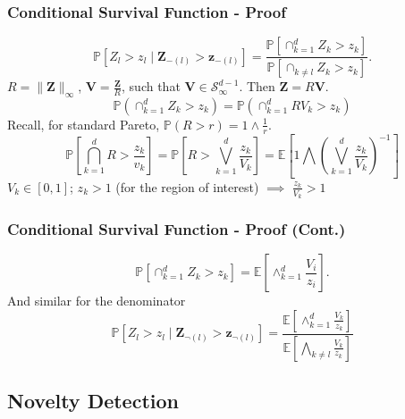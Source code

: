 \documentclass[aspectratio=169,10pt]{beamer}
\begin{document}
\begin{frame}
  \frametitle{Conditional Survival Function - Proof}
  {\small
  \begin{equation*}
    \label{eqn:condsurv1d}
    \mathbb{P}\left[Z_l > z_l\mid \bm{Z}_{-(l)} > \bm{z}_{-(l)}\right] =
      \frac{\mathbb{P}\left[\cap_{k = 1}^d Z_k > z_k\right]}{\mathbb{P}\left[\cap_{k \neq l} Z_k > z_k\right]}.
  \end{equation*}
  $R = \lVert\bm{Z}\rVert_{\infty}$, $\bm{V} = \frac{\bm{Z}}{R}$, such that
    $\bm{V}\in \mathcal{S}_{\infty}^{d-1}$.  Then $\bm{Z} = R\bm{V}$.
  \begin{equation*}
    \mathbb{P}\left(\cap_{k = 1}^d Z_k > z_k\right) = \mathbb{P}\left(\cap_{k = 1}^d RV_k > z_k\right)
  \end{equation*}
  Recall, for standard Pareto, $\mathbb{P}(R > r) = 1\wedge\frac{1}{r}$.
  \begin{equation*}
    \mathbb{P}\left[\bigcap_{k = 1}^d R > \frac{z_k}{v_k}\right] =
      \mathbb{P}\left[R  > \bigvee_{k=1}^d\frac{z_k}{V_k}\right] =
      \mathbb{E}\left[1 \bigwedge \left(\bigvee_{k = 1}^d\frac{z_k}{V_k}\right)^{-1}\right]
  \end{equation*}
  $V_k \in [0,1]$; $z_k > 1$ (for the region of interest) $\implies$ $\frac{z_k}{V_k} > 1$
  }
\end{frame}

\begin{frame}
    \frametitle{Conditional Survival Function - Proof (Cont.)}
    {\small 
  \begin{equation*}
    \mathbb{P}\left[\cap_{k = 1}^d Z_k > z_k\right] = \mathbb{E}\left[\wedge_{k = 1}^d\frac{V_i}{z_i}\right].
  \end{equation*}
  And similar for the denominator
  \begin{equation*}
    \mathbb{P}\left[Z_l > z_l\mid \bm{Z}_{\neg(l)} > \bm{z}_{\neg(l)}\right] =
      \frac{\mathbb{E}\left[\wedge_{k = 1}^d \frac{V_k}{z_k}\right]}{\mathbb{E}\left[
                \bigwedge_{k \neq l}\frac{V_k}{z_k}\right]}
  \end{equation*}
  }
\end{frame}

\subsection*{Novelty Detection}
\end{document}
